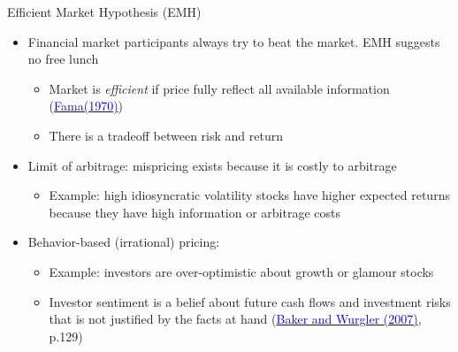 \documentclass{beamer}
\begin{document}
\begin{frame}{Efficient Market Hypothesis (EMH)}
	\begin{itemize}
		\item Financial market participants always try to beat the market. EMH suggests no free lunch
		\begin{itemize}
			\item Market is \textit{efficient} if price fully reflect all available information (\href{https://doi.org/10.2307/2325486}{\textcolor{blue}{Fama(1970)}})
			\item There is a tradeoff between risk and return
		\end{itemize}
		\item Limit of arbitrage: mispricing exists because it is costly to arbitrage
		\begin{itemize}
			\item Example: high idiosyncratic volatility stocks have higher expected returns
			because they have high information or arbitrage costs
		\end{itemize}
		\item Behavior-based (irrational) pricing: 
		     \begin{itemize}
			\item Example: investors are over-optimistic about growth or glamour stocks
			\item Investor sentiment is a belief about future cash flows and investment risks that is not justified by the facts at hand (\href{https://www.aeaweb.org/articles?id=10.1257/jep.21.2.129}{\textcolor{blue}{Baker and Wurgler (2007)}}, p.129)
		\end{itemize}
	\end{itemize}
\end{frame}
\end{document}
